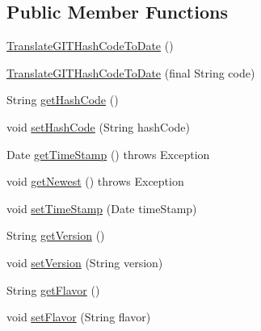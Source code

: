 \subsection*{Public Member Functions}
\begin{DoxyCompactItemize}
\item 
\hyperlink{classgov_1_1fnal_1_1ppd_1_1dd_1_1util_1_1specific_1_1TranslateGITHashCodeToDate_a2d9b93752fc286129e67c98556b0c634}{Translate\-G\-I\-T\-Hash\-Code\-To\-Date} ()
\item 
\hyperlink{classgov_1_1fnal_1_1ppd_1_1dd_1_1util_1_1specific_1_1TranslateGITHashCodeToDate_aa091fef236c815b679388cbe83048b6b}{Translate\-G\-I\-T\-Hash\-Code\-To\-Date} (final String code)
\item 
String \hyperlink{classgov_1_1fnal_1_1ppd_1_1dd_1_1util_1_1specific_1_1TranslateGITHashCodeToDate_a541c4eab3fd282417775f82bc170a45f}{get\-Hash\-Code} ()
\item 
void \hyperlink{classgov_1_1fnal_1_1ppd_1_1dd_1_1util_1_1specific_1_1TranslateGITHashCodeToDate_ae4e0b19867598bff559ace63d4742a09}{set\-Hash\-Code} (String hash\-Code)
\item 
Date \hyperlink{classgov_1_1fnal_1_1ppd_1_1dd_1_1util_1_1specific_1_1TranslateGITHashCodeToDate_a1f419f8fad89c657344d3d4360b35f8c}{get\-Time\-Stamp} ()  throws Exception 
\item 
void \hyperlink{classgov_1_1fnal_1_1ppd_1_1dd_1_1util_1_1specific_1_1TranslateGITHashCodeToDate_aee2f148a3a99bf1915376b781887fad4}{get\-Newest} ()  throws Exception 
\item 
void \hyperlink{classgov_1_1fnal_1_1ppd_1_1dd_1_1util_1_1specific_1_1TranslateGITHashCodeToDate_afa90256edb906d24dac33e4bc1e74997}{set\-Time\-Stamp} (Date time\-Stamp)
\item 
String \hyperlink{classgov_1_1fnal_1_1ppd_1_1dd_1_1util_1_1specific_1_1TranslateGITHashCodeToDate_ad4674ae96db7ac14e7f164090be5dfb1}{get\-Version} ()
\item 
void \hyperlink{classgov_1_1fnal_1_1ppd_1_1dd_1_1util_1_1specific_1_1TranslateGITHashCodeToDate_a7a65833daf1de4a382021e81f7f7c3d6}{set\-Version} (String version)
\item 
String \hyperlink{classgov_1_1fnal_1_1ppd_1_1dd_1_1util_1_1specific_1_1TranslateGITHashCodeToDate_a11f32d155097fc3bf3cd68aafd113072}{get\-Flavor} ()
\item 
void \hyperlink{classgov_1_1fnal_1_1ppd_1_1dd_1_1util_1_1specific_1_1TranslateGITHashCodeToDate_a4f142b3b8950000d9e818bcc4d2a87c5}{set\-Flavor} (String flavor)
\end{DoxyCompactItemize}
